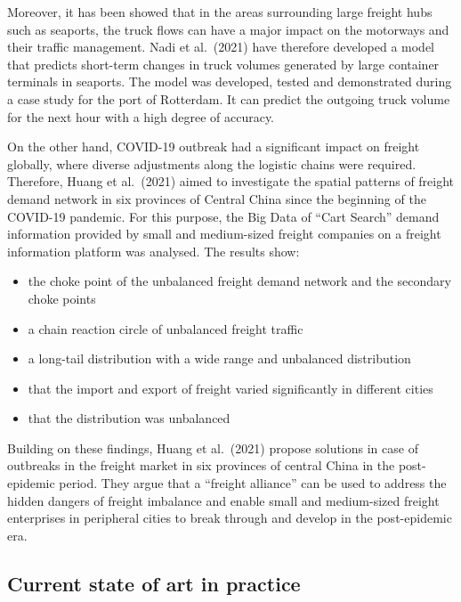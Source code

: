 \documentclass[
]{book}
\providecommand{\tightlist}{%
  \setlength{\itemsep}{0pt}\setlength{\parskip}{0pt}}
\begin{document}
Moreover, it has been showed that in the areas surrounding large freight hubs such as seaports, the truck flows can have a major impact on the motorways and their traffic management. Nadi et al.~(2021) have therefore developed a model that predicts short-term changes in truck volumes generated by large container terminals in seaports. The model was developed, tested and demonstrated during a case study for the port of Rotterdam. It can predict the outgoing truck volume for the next hour with a high degree of accuracy.

On the other hand, COVID-19 outbreak had a significant impact on freight globally, where diverse adjustments along the logistic chains were required. Therefore, Huang et al.~(2021) aimed to investigate the spatial patterns of freight demand network in six provinces of Central China since the beginning of the COVID-19 pandemic. For this purpose, the Big Data of ``Cart Search'' demand information provided by small and medium-sized freight companies on a freight information platform was analysed. The results show:

\begin{itemize}
\tightlist
\item
  the choke point of the unbalanced freight demand network and the secondary choke points
\item
  a chain reaction circle of unbalanced freight traffic
\item
  a long-tail distribution with a wide range and unbalanced distribution
\item
  that the import and export of freight varied significantly in different cities
\item
  that the distribution was unbalanced
\end{itemize}

Building on these findings, Huang et al.~(2021) propose solutions in case of outbreaks in the freight market in six provinces of central China in the post-epidemic period. They argue that a ``freight alliance'' can be used to address the hidden dangers of freight imbalance and enable small and medium-sized freight enterprises in peripheral cities to break through and develop in the post-epidemic era.

\hypertarget{current-state-of-art-in-practice-35}{%
\subsection*{Current state of art in practice}\label{current-state-of-art-in-practice-35}}
\end{document}
